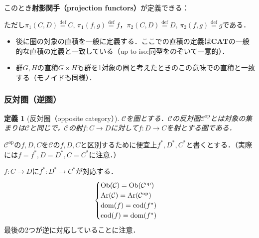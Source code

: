 \documentclass[dvipdfmx,a4j,10pt]{jsarticle}
\theoremstyle{mystyle1}
\theoremstyle{mystyle2}
\newtheorem{dfn*}{定義}
\newcommand*{\defeq}{\stackrel{\text{def}}{=}}
\newcommand{\Ob}{{\rm Ob}}
\newcommand{\Ar}{{\rm Ar}}
\newcommand{\dom}{{\rm dom}}
\newcommand{\cod}{{\rm cod}}
\begin{document}
    このとき\textbf{射影関手（projection functors）}が定義できる：

    \begin{center}
    \end{center}
    ただし$\pi_1(C,D)\defeq C,\, \pi_1(f,g)\defeq f$，$\pi_2(C,D)\defeq D,\, \pi_2(f,g)\defeq g$である．

    \begin{itemize}
        \item 後に圏の対象の直積を一般に定義する．ここでの直積の定義は$\mathbf{CAT}$の一般的な直積の定義と一致している（up to iso:同型をのぞいて一意的）．
        \item 群$G,H$の直積$G\times H$も群を1対象の圏と考えたときのこの意味での直積と一致する（モノイドも同様）．
    \end{itemize}

    \subsubsection{反対圏（逆圏）}

    \begin{dfn*}[反対圏（opposite category）\footnotemark]
        $\mathcal{C}$を圏とする．$\mathcal{C}$の反対圏$\mathcal{C}^{\mathrm{op}}$とは対象の集まりは$\mathcal{C}$と同じで，$\mathcal{C}$の射$f:C\to D$に対して$f:D\to C$を射とする圏である．
    \end{dfn*}

$\mathcal{C}^{\mathrm{op}}$の$f,D,C$を$\mathcal{C}$の$f,D,C$と区別するために便宜上$f^*,D^*,C^*$と書くとする．（実際には$f=f^*,D=D^*,C=C^*$に注意．）

$f:C\to D$に$f^*:D^* \to C^*$が対応する．
    \[
        \begin{cases}
            \Ob(\mathcal{C})  =\Ob(\mathcal{C}^{\mathrm{op}}) \\
            \Ar(\mathcal{C})  =\Ar(\mathcal{C}^{\mathrm{op}}) \\
            \dom(f)           =\cod(f^*)                      \\
            \cod(f)           =\dom(f^*)
        \end{cases}
    \]
    最後の2つが逆に対応していることに注意．
\end{document}
